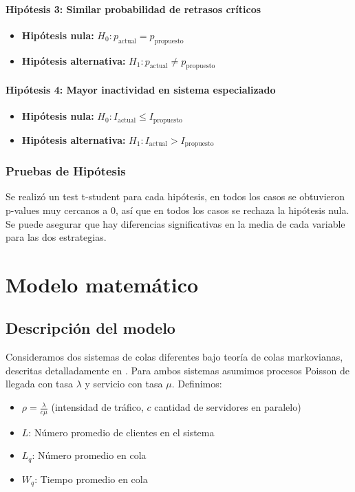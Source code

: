 \documentclass[letterpaper, 12pt]{report}
\begin{document}
\subsubsection{Hipótesis 3: Similar probabilidad de retrasos críticos}
\begin{itemize}
    \item \textbf{Hipótesis nula:} $H_0: p_{\text{actual}} = p_{\text{propuesto}}$ 
    \item \textbf{Hipótesis alternativa:} $H_1: p_{\text{actual}} \neq p_{\text{propuesto}}$ 
\end{itemize}


\subsubsection{Hipótesis 4: Mayor inactividad en sistema especializado}
\begin{itemize}
    \item \textbf{Hipótesis nula:} $H_0: I_{\text{actual}} \leq I_{\text{propuesto}}$ 
    \item \textbf{Hipótesis alternativa:} $H_1: I_{\text{actual}} > I_{\text{propuesto}}$ 
\end{itemize}

\subsection{Pruebas de Hipótesis}

Se realiz\'o un test t-student para cada hipótesis, en todos los casos se 
obtuvieron p-values muy cercanos a 0, así que en todos los casos
se rechaza la hipótesis nula. Se puede asegurar que hay diferencias significativas
en la media de cada variable para las dos estrategias.

\chapter{Modelo matemático}


\section{Descripción del modelo}

Consideramos dos sistemas de colas diferentes bajo teoría de colas markovianas, descritas detalladamente en \cite{queue}. Para ambos sistemas asumimos 
procesos Poisson de llegada con tasa $\lambda$ y servicio con tasa $\mu$. Definimos:
\begin{itemize}
    \item $\rho = \frac{\lambda}{c\mu}$ (intensidad de tráfico, $c$ cantidad de servidores en paralelo)
    \item $L$: Número promedio de clientes en el sistema
    \item $L_q$: Número promedio en cola
    \item $W_q$: Tiempo promedio en cola
\end{itemize}
\end{document}
